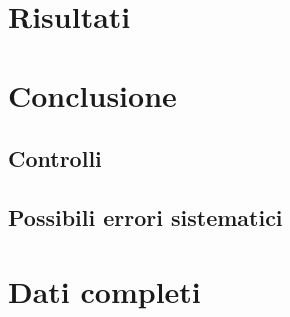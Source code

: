 \documentclass[italian, a4paper, 10pt, twocolumn]{../../style/lab_unige}
\begin{document}
    \section{Risultati}
    \label{section:results}
    
    \section{Conclusione}
    \label{section:conclusion}

    \subsection{Controlli}

    \subsection{Possibili errori sistematici}

    \appendix

    \setcounter{table}{0}
    \renewcommand{\thetable}{A\arabic{table}}

    \section{Dati completi}
    
    
\end{document}
